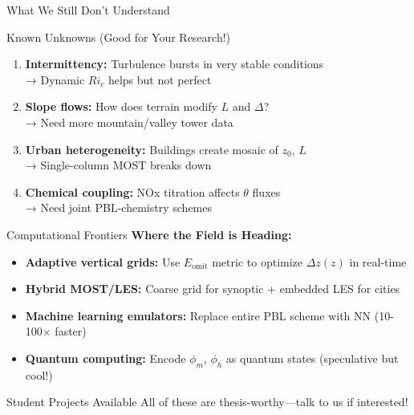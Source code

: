 \documentclass[10pt,aspectratio=169]{beamer}
\begin{document}
\begin{frame}{What We Still Don't Understand}
  \begin{alertblock}{Known Unknowns (Good for Your Research!)}
    \begin{enumerate}
      \item \textbf{Intermittency:} Turbulence bursts in very stable conditions\\
      → Dynamic $Ri_c$ helps but not perfect
      
      \item \textbf{Slope flows:} How does terrain modify $L$ and $\Delta$?\\
      → Need more mountain/valley tower data
      
      \item \textbf{Urban heterogeneity:} Buildings create mosaic of $z_0$, $L$\\
      → Single-column MOST breaks down
      
      \item \textbf{Chemical coupling:} NOx titration affects $\theta$ fluxes\\
      → Need joint PBL-chemistry schemes
    \end{enumerate}
  \end{alertblock}
\end{frame}

\begin{frame}{Computational Frontiers}
  \textbf{Where the Field is Heading:}
  
  \begin{itemize}
    \item \textbf{Adaptive vertical grids:} Use $E_{\text{omit}}$ metric to optimize $\Delta z(z)$ in real-time
    
    \item \textbf{Hybrid MOST/LES:} Coarse grid for synoptic + embedded LES for cities
    
    \item \textbf{Machine learning emulators:} Replace entire PBL scheme with NN (10-100× faster)
    
    \item \textbf{Quantum computing:} Encode $\phi_m$, $\phi_h$ as quantum states (speculative but cool!)
  \end{itemize}
  
  \vspace{0.5cm}
  \begin{exampleblock}{Student Projects Available}
    All of these are \alert{thesis-worthy}—talk to us if interested!
  \end{exampleblock}
\end{frame}
\end{document}
